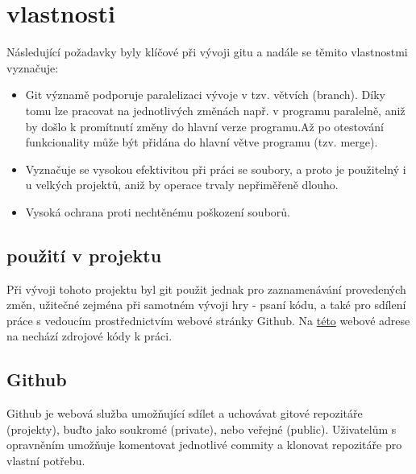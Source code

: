\documentclass[main.tex]{subfiles}
\begin{document}


\section{vlastnosti}
Následující požadavky byly klíčové při vývoji gitu a nadále se těmito vlastnostmi vyznačuje:
\begin{itemize}
\item Git významě podporuje paralelizaci vývoje v tzv. větvích (branch). Díky tomu lze pracovat na jednotlivých změnách např. v programu paralelně, aniž by došlo k promítnutí změny do hlavní verze programu.Až po otestování funkcionality může být přidána do hlavní větve programu (tzv. merge). 

\item Vyznačuje se vysokou efektivitou při práci se soubory, a proto je použitelný i u velkých projektů, aniž by operace trvaly nepřiměřeně dlouho.

\item Vysoká ochrana proti nechtěnému poškození souborů.

\end{itemize}





\subsection{použití v projektu}
Při vývoji tohoto projektu byl git použit jednak pro zaznamenávání provedených změn, užitečné zejména při samotném vývoji hry - psaní kódu, a také pro sdílení práce s vedoucím prostřednictvím webové stránky Github. Na \href{https://github.com/vojta006/mp}{této} webové adrese na nechází zdrojové kódy k práci.

\subsection{Github}
Github je webová služba umožňující sdílet a uchovávat gitové repozitáře (projekty), buďto jako soukromé (private), nebo veřejné (public). Uživatelům s opravněním umožňuje komentovat jednotlivé commity a klonovat repozitáře pro vlastní potřebu. 
\end{document}

